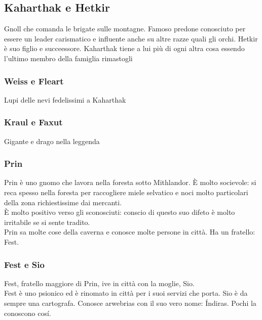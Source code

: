 \subsection{Kaharthak e Hetkir}\label{char:kaharthak}
Gnoll che comanda le brigate sulle montagne. Famoso predone conosciuto per essere
un leader carismatico e influente anche su altre razze quali gli orchi.
Hetkir \`e suo figlio e succeessore. Kaharthak tiene a lui pi\`u di ogni altra cosa
essendo l'ultimo membro della famiglia rimastogli
\subsubsection{Weiss e Fleart}\label{char:weiss}
Lupi delle nevi fedelissimi a Kaharthak
\subsubsection{Kraul e Faxut}\label{char:kraul}
Gigante e drago nella leggenda
\subsubsection{Prin}\label{char:prin}
Prin \`e uno gnomo che lavora nella foresta sotto Mithlandor. \`E molto socievole: si
reca spesso nella foresta per raccogliere miele selvatico e noci molto particolari
della zona richiestissime dai mercanti.\\
\`E molto positivo verso gli sconosciuti: conscio di questo suo difeto \`e molto irritabile
se si sente tradito.\\
Prin sa molte cose della caverna e conosce molte persone in citt\`a. Ha un fratello: Fest.
\subsubsection{Fest e Sio}
Fest, fratello maggiore di Prin, ive in citt\`a con la moglie, Sio.\\
Fest \`e uno psionico ed \`e rinomato in citt\`a per i suoi servizi che porta.
Sio \`e da sempre una cartografa. Conosce arwebrias con il suo vero nome: \'Indiras.
Pochi la conoscono cos\'i.